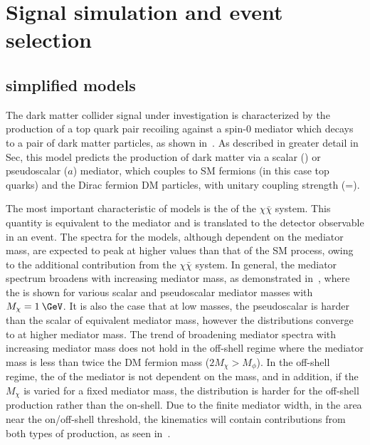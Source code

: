 \chapter{Signal simulation and event selection} 
\label{chap:signalsel}

\section{\ttDM simplified models}

The dark matter collider signal under investigation is characterized by the production of a top quark pair recoiling against a spin-0 mediator which decays to a pair of dark matter particles, as shown in~. As described in greater detail in Sec, this model predicts the production of dark matter via a scalar (\phi) or pseudoscalar ($a$) mediator, which couples to SM fermions (in this case top quarks) and the Dirac fermion DM particles, with unitary coupling strength (\gq=). 

The most important characteristic of \ttDM models is the \pt of the $\chi\bar{\chi}$ system. This quantity is equivalent to the mediator \pt and is translated to the \ptmiss detector observable in an event. The \ptmiss spectra for the \ttDM models, although dependent on the mediator mass, are expected to peak at higher values than that of the SM \ttbar process, owing to the additional contribution from the $\chi\bar{\chi}$ system. In general, the mediator \pt spectrum broadens with increasing mediator mass, as demonstrated in~, where the \pt is shown for various scalar and pseudoscalar mediator masses with $M_\chi=1\:\GeV$. It is also the case that at low masses, the pseudoscalar \pt is harder than the scalar \pt of equivalent mediator mass, however the distributions converge to at higher mediator mass. The trend of broadening mediator \pt spectra with increasing mediator mass does not hold in the off-shell regime where the mediator mass is less than twice the DM fermion mass ($2M_\chi > M_\phi$). In the off-shell regime, the \pt of the mediator is not dependent on the mass, and in addition, if the $M_\chi$ is varied for a fixed mediator mass, the \pt distribution is harder for the off-shell production rather than the on-shell. Due to the finite mediator width, in the area near the on/off-shell threshold, the kinematics will contain contributions from both types of production, as seen in~. 

